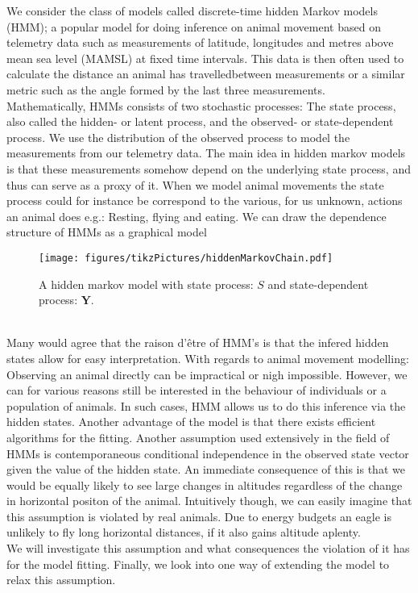 We consider the class of models called discrete-time hidden Markov models (HMM); a popular model for doing inference on animal movement based on telemetry data such as measurements of latitude, longitudes and metres above mean sea level (MAMSL) at fixed time intervals. This data is then often used to calculate the distance an animal has travelledbetween measurements or a similar metric such as the angle formed by the last three measurements.\\ Mathematically, HMMs consists of two stochastic processes: The state process, also called the hidden- or latent process, and the observed- or state-dependent process. 
We use the distribution of the observed process to model the measurements from our telemetry data. The main idea in hidden markov models is that these measurements somehow depend on the underlying state process, and thus can serve as a proxy of it. When we model animal movements the state process could for instance be correspond to the various, for us unknown, actions an animal does e.g.: Resting, flying and eating. \cite{HHMForTimesSeries} We can draw the dependence structure of HMMs as a graphical model
\begin{figure}[h]
    \centering
    \texttt{[image: figures/tikzPictures/hiddenMarkovChain.pdf]}
    \caption{A hidden markov model with state process: $S$ and state-dependent process: $\mathbf{Y}$.}
\end{figure}\\
Many would agree that the raison d'être of HMM's is that the infered hidden states allow for easy interpretation. With regards to animal movement modelling: Observing an animal directly can be impractical or nigh impossible. However, we can for various reasons still be interested in the behaviour of individuals or a population of animals. In such cases, HMM allows us to do this inference via the hidden states.  Another advantage of the model is that there exists efficient algorithms for the fitting. Another assumption used extensively in the field of HMMs is contemporaneous conditional independence in the observed state vector given the value of the hidden state. An immediate consequence of this is that we would be equally likely to see large changes in altitudes regardless of the change in horizontal positon of the animal. Intuitively though, we can easily imagine that this assumption is violated by real animals. Due to energy budgets an eagle is unlikely to fly long horizontal distances, if it also gains altitude aplenty. \\
We will investigate this assumption and what consequences the violation of it has for the model fitting. Finally, we look into one way of extending the model to relax this assumption.